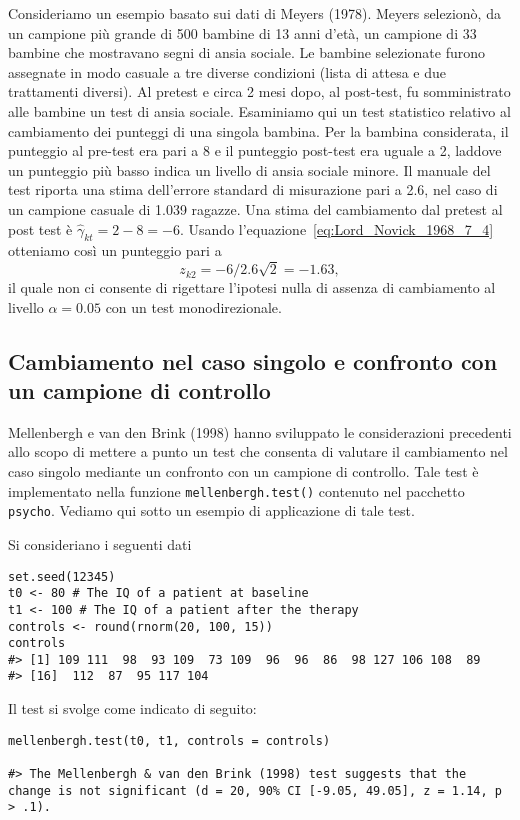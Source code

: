 \begin{exmp}
Consideriamo un esempio basato sui dati di Meyers (1978).
Meyers selezionò, da un campione più grande di 500 bambine di 13 anni d'età, un campione di 33 bambine che mostravano segni di ansia sociale.
Le bambine selezionate furono assegnate in modo casuale a tre diverse condizioni (lista di attesa e due trattamenti diversi). 
Al pretest e circa 2 mesi dopo, al post-test, fu somministrato alle bambine un test di ansia sociale. 
Esaminiamo qui un test statistico relativo al cambiamento dei punteggi di una singola bambina.
Per la bambina considerata, il punteggio al pre-test era pari a 8 e il punteggio post-test era uguale a 2, laddove un punteggio più basso indica un livello di ansia sociale minore. 
Il manuale del test riporta una stima dell'errore standard di misurazione pari a 2.6, nel caso di un campione casuale di 1.039 ragazze. 
Una stima del cambiamento dal pretest al post test è $\hat{\gamma}_{kt} = 2 - 8 = -6$.
Usando l'equazione~\eqref{eq:Lord_Novick_1968_7_4} otteniamo così un punteggio pari a
\[
z_{k2} = -6 / 2.6 \sqrt{2} = -1.63,
\]
il quale non ci consente di rigettare l'ipotesi nulla di assenza di cambiamento al livello $\alpha = 0.05$ con un test monodirezionale.
\end{exmp}


\subsection{Cambiamento nel caso singolo e confronto con un campione di controllo}

Mellenbergh e van den Brink (1998) hanno sviluppato le considerazioni precedenti allo scopo di mettere a punto un test che consenta di valutare il cambiamento nel caso singolo mediante un confronto con un campione di controllo.
Tale test è implementato nella funzione \verb+mellenbergh.test()+ contenuto nel pacchetto \verb+psycho+.
Vediamo qui sotto un esempio di applicazione di tale test.

\begin{exmp}
Si consideriano i seguenti dati
\begin{lstlisting}
set.seed(12345)
t0 <- 80 # The IQ of a patient at baseline
t1 <- 100 # The IQ of a patient after the therapy
controls <- round(rnorm(20, 100, 15))
controls
#> [1] 109 111  98  93 109  73 109  96  96  86  98 127 106 108  89 
#> [16]  112  87  95 117 104
\end{lstlisting}
Il test si svolge come indicato di seguito:
\begin{lstlisting}
mellenbergh.test(t0, t1, controls = controls)

#> The Mellenbergh & van den Brink (1998) test suggests that the change is not significant (d = 20, 90% CI [-9.05, 49.05], z = 1.14, p > .1).
\end{lstlisting}
\end{exmp}


